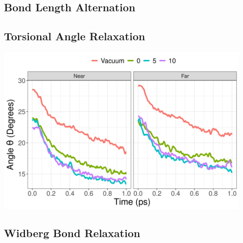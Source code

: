 \subsection{Bond Length Alternation}

\subsection{Torsional Angle Relaxation}

\noindent
\begin{minipage}[c]{\textwidth}
  \centering
  \includegraphics[width=5in]{../Paper2/Images/dihedral/solvent_comparison.png}
  \label{dihedralNonadiabatic}
\end{minipage}\bigskip

\subsection{Widberg Bond Relaxation}

